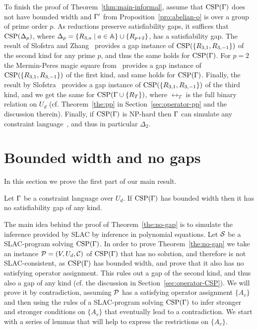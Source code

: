 \documentclass[11pt,letter]{article}
\begin{document}
\smallskip
To finish the proof of Theorem~\ref{thm:main-informal}, assume that
${\rm CSP}(\Gamma)$ does not have bounded width and $\Gamma'$ from
Proposition~\ref{pro:abelian-o} is over a group of prime order $p$. As reductions preserve satisfiability gaps, it suffices that
${\rm CSP}(\Delta_p)$, where $\Delta_p=\{R_{3,a}\mid a\in{\mathbb A}\}\cup\{R_{p+2}\}$, has a
satisfiability gap. The result of
Slofstra and Zhang~\cite{SZ24:personal} provides a gap instance of ${\rm CSP}(\{R_{3,1},R_{3,-1}\})$ of the 
second kind for any prime $p$, and thus the same holds for ${\rm CSP}(\Gamma)$.
For $p=2$ the Mermin-Peres magic square from~\cite{Mermin1990simple}
provides a gap instance of ${\rm CSP}(\{R_{3,1},R_{3,-1}\})$ of the first kind,
and same holds for ${\rm CSP}(\Gamma)$.
Finally, the result by Slofstra~\cite{Slofstra20:jams} provides a gap instance of
${\rm CSP}(\{R_{3,1},R_{3,-1}\})$ of the third kind, and we get the same for
${\rm CSP}(\Gamma\cup\{R_T\})$, where $\rel_T$ is the full binary relation on $U_d$ (cf.
Theorem~\ref{the:pp} in Section~\ref{sec:operator-pp} and the discussion
therein). Finally, if ${\rm CSP}(\Gamma)$ is NP-hard then $\Gamma$ can simulate any
constraint language~\cite{Bulatov05:classifying}, and thus in particular $\Delta_2$.


 

\section{Bounded width and no gaps}\label{sec:no-gap}

In this section we prove the first part of our main result.

\begin{theorem}\label{the:no-gap}
Let $\Gamma$ be a constraint language over $U_d$. If ${\rm CSP}(\Gamma)$ has bounded
  width then it has no satisfiability gap of any kind.
\end{theorem}

The main idea behind the proof
of Theorem~\ref{the:no-gap} is to simulate the inference provided by SLAC 
by inference in polynomial equations. Let ${\mathcal S}$ be a SLAC-program solving ${\rm CSP}(\Gamma)$.
In order to prove Theorem~\ref{the:no-gap} we take an instance ${\mathcal P}=(V,U_d,{\mathcal C})$
of ${\rm CSP}(\Gamma)$ that has no solution, and therefore is not SLAC-consistent, as
${\rm CSP}(\Gamma)$ has bounded width, and prove that it also has no satisfying operator
assignment. This rules out a gap of the second kind, and thus also a gap of any
kind (cf. the discussion in Section~\ref{sec:operator-CSP}). We will prove it by contradiction, assuming ${\mathcal P}$ has a satisfying operator assignment $\{A_v\}$ and then using the rules of a SLAC-program solving ${\rm CSP}(\Gamma)$ to infer stronger and stronger conditions on $\{A_v\}$ that eventually lead to a contradiction. We start with a series of lemmas that will help to express the restrictions on $\{A_v\}$.
\end{document}
